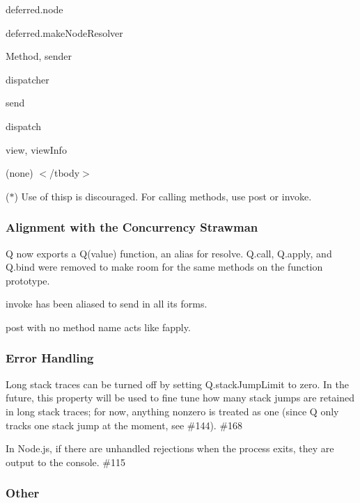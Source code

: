 {\ttfamily deferred.\+node} 

{\ttfamily deferred.\+make\+Node\+Resolver}  

{\ttfamily Method}, {\ttfamily sender} 

{\ttfamily dispatcher}  

{\ttfamily send} 

{\ttfamily dispatch}  

{\ttfamily view}, {\ttfamily view\+Info} 

(none)  $<$/tbody$>$ 

($\ast$) Use of {\ttfamily thisp} is discouraged. For calling methods, use {\ttfamily post} or {\ttfamily invoke}.

\subsubsection*{Alignment with the Concurrency Strawman}


\begin{DoxyItemize}
\item Q now exports a {\ttfamily Q(value)} function, an alias for {\ttfamily resolve}. {\ttfamily Q.\+call}, {\ttfamily Q.\+apply}, and {\ttfamily Q.\+bind} were removed to make room for the same methods on the function prototype.
\item {\ttfamily invoke} has been aliased to {\ttfamily send} in all its forms.
\item {\ttfamily post} with no method name acts like {\ttfamily fapply}.
\end{DoxyItemize}

\subsubsection*{Error Handling}


\begin{DoxyItemize}
\item Long stack traces can be turned off by setting {\ttfamily Q.\+stack\+Jump\+Limit} to zero. In the future, this property will be used to fine tune how many stack jumps are retained in long stack traces; for now, anything nonzero is treated as one (since Q only tracks one stack jump at the moment, see \#144). \#168
\item In Node.\+js, if there are unhandled rejections when the process exits, they are output to the console. \#115
\end{DoxyItemize}

\subsubsection*{Other}


